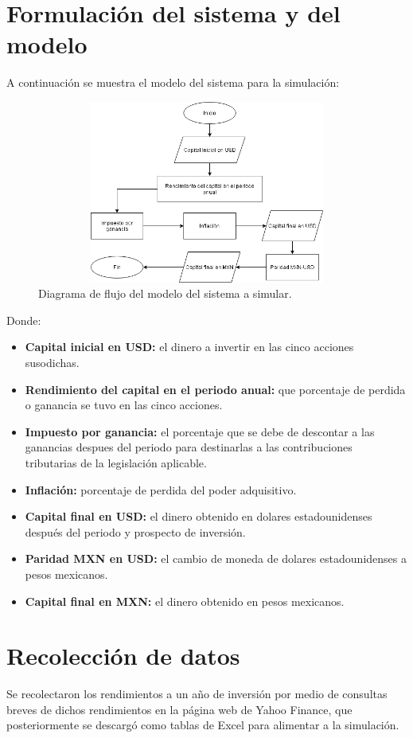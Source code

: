\documentclass[letterpaper, 12pt]{article}
\begin{document}
\begin{justify}
        \section{Formulación del sistema y del modelo}
        \justify
        A continuación se muestra el modelo del sistema para la simulación:
        \begin{figure}[H]
            \centering
            \includegraphics[width=14cm,height=6cm]{FlowchartSIMULATION.png}
            \caption{Diagrama de flujo del modelo del sistema a simular.}
        \end{figure}
        \justify
        Donde:
        \begin{itemize}
            \item \textbf{Capital inicial en USD:} el dinero a invertir en las cinco acciones susodichas.
            \item \textbf{Rendimiento del capital en el periodo anual:} que porcentaje de perdida o ganancia se tuvo en las cinco acciones.
            \item \textbf{Impuesto por ganancia:} el porcentaje que se debe de descontar a las ganancias despues del periodo para destinarlas a las contribuciones tributarias de la legislación aplicable.
            \item \textbf{Inflación:} porcentaje de perdida del poder adquisitivo.
            \item \textbf{Capital final en USD:} el dinero obtenido en dolares estadounidenses después del periodo y prospecto de inversión.
            \item \textbf{Paridad MXN en USD:} el cambio de moneda de dolares estadounidenses a pesos mexicanos.
            \item \textbf{Capital final en MXN:} el dinero obtenido en pesos mexicanos.
        \end{itemize}
        \section{Recolección de datos}
        \justify
        Se recolectaron los rendimientos a un año de inversión por medio de consultas breves de dichos rendimientos en la página web de Yahoo Finance, que posteriormente se descargó como tablas de Excel para alimentar a la simulación.

\end{justify}
\end{document}
